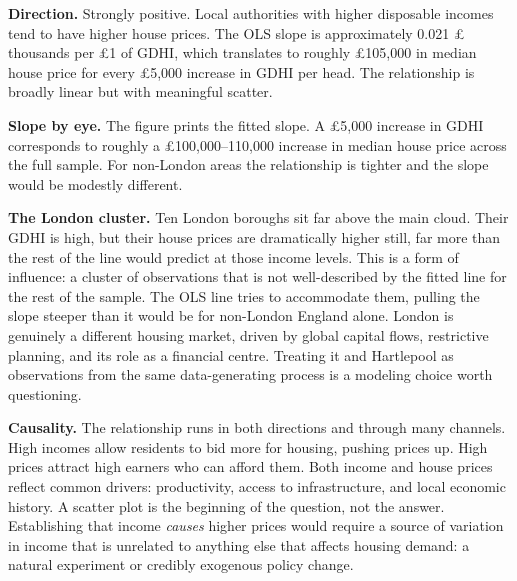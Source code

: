 \documentclass[
  letterpaper,
  11pt,
  twoside,
  openany]{scrbook}
\begin{document}
\begin{tcolorbox}[enhanced jigsaw, arc=.35mm, bottomrule=.15mm, bottomtitle=1mm, breakable, colback=white, colbacktitle=quarto-callout-note-color!10!white, colframe=quarto-callout-note-color-frame, coltitle=black, left=2mm, leftrule=.75mm, opacityback=0, opacitybacktitle=0.6, rightrule=.15mm, title=\textcolor{quarto-callout-note-color}{\faInfo}\hspace{0.5em}{Solution to Problem 9}, titlerule=0mm, toprule=.15mm, toptitle=1mm]

\textbf{Direction.} Strongly positive. Local authorities with higher
disposable incomes tend to have higher house prices. The OLS slope is
approximately 0.021 £ thousands per £1 of GDHI, which translates to
roughly £105,000 in median house price for every £5,000 increase in GDHI
per head. The relationship is broadly linear but with meaningful
scatter.

\textbf{Slope by eye.} The figure prints the fitted slope. A £5,000
increase in GDHI corresponds to roughly a £100,000--110,000 increase in
median house price across the full sample. For non-London areas the
relationship is tighter and the slope would be modestly different.

\textbf{The London cluster.} Ten London boroughs sit far above the main
cloud. Their GDHI is high, but their house prices are dramatically
higher still, far more than the rest of the line would predict at those
income levels. This is a form of influence: a cluster of observations
that is not well-described by the fitted line for the rest of the
sample. The OLS line tries to accommodate them, pulling the slope
steeper than it would be for non-London England alone. London is
genuinely a different housing market, driven by global capital flows,
restrictive planning, and its role as a financial centre. Treating it
and Hartlepool as observations from the same data-generating process is
a modeling choice worth questioning.

\textbf{Causality.} The relationship runs in both directions and through
many channels. High incomes allow residents to bid more for housing,
pushing prices up. High prices attract high earners who can afford them.
Both income and house prices reflect common drivers: productivity,
access to infrastructure, and local economic history. A scatter plot is
the beginning of the question, not the answer. Establishing that income
\emph{causes} higher prices would require a source of variation in
income that is unrelated to anything else that affects housing demand: a
natural experiment or credibly exogenous policy change.

\end{tcolorbox}
\end{document}
